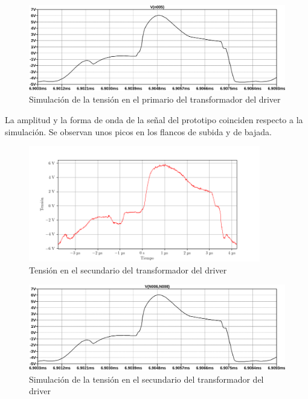 \begin{figure}[H]
    \centering
    \includegraphics[width=\textwidth]{images/sim/4.pdf}
    \caption{Simulación de la tensión en el primario del transformador del driver}
    \label{fig:sim:4}
\end{figure}

La amplitud y la forma de onda de la señal del prototipo coinciden respecto a la simulación. 
Se observan unos picos en los flancos de subida y de bajada. 

\begin{figure}[H]
    \centering
    \includegraphics[width=0.9\textwidth]{images/capturas-osciloscopio/17-11-2022/9.png}
    \caption{Tensión en el secundario del transformador del driver}
    \label{fig:osc:9}
\end{figure}

\begin{figure}[H]
    \centering
    \includegraphics[width=\textwidth]{images/sim/5.pdf}
    \caption{Simulación de la tensión en el secundario del transformador del driver}
    \label{fig:sim:5}
\end{figure}

